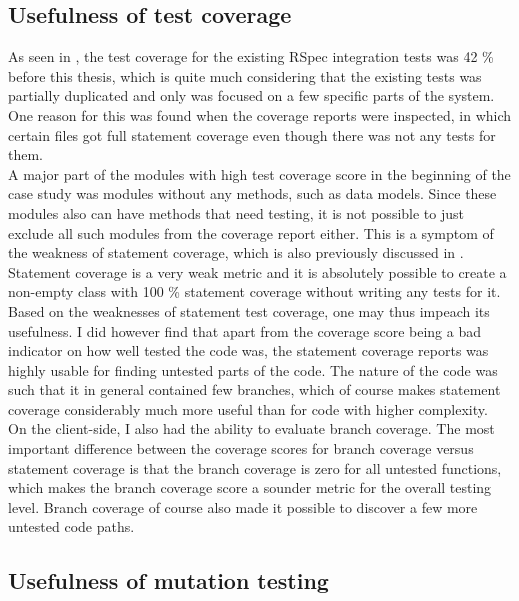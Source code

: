 
\subsection{Usefulness of test coverage}

As seen in , the test coverage for the
existing RSpec integration tests was 42 \% before this thesis, which is
quite much considering that the existing tests was partially duplicated
and only was focused on a few specific parts of the system. One reason
for this was found when the coverage reports were inspected, in which
certain files got full statement coverage even though there was not any
tests for them.\\

A major part of the modules with high test coverage score in the
beginning of the case study was modules without any methods, such as
data models. Since these modules also can have methods that need
testing, it is not possible to just exclude all such modules from the
coverage report either. This is a symptom of the weakness of statement
coverage, which is also previously discussed in
. Statement coverage is a very weak
metric and it is absolutely possible to create a non-empty class with
100 \% statement coverage without writing any tests for it.\\

Based on the weaknesses of statement test coverage, one may thus impeach
its usefulness. I did however find that apart from the coverage score
being a bad indicator on how well tested the code was, the
statement coverage reports was highly usable for finding untested parts
of the code. The nature of the code was such that it in general
contained few branches, which of course makes statement coverage
considerably much more useful than for code with higher complexity.\\

On the client-side, I also had the ability to evaluate branch coverage.
The most important difference between the coverage scores for branch
coverage versus statement coverage is that the branch coverage is zero
for all untested functions, which makes the branch coverage score a
sounder metric for the overall testing level. Branch coverage of course
also made it possible to discover a few more untested code paths.\\


\subsection{Usefulness of mutation testing}

